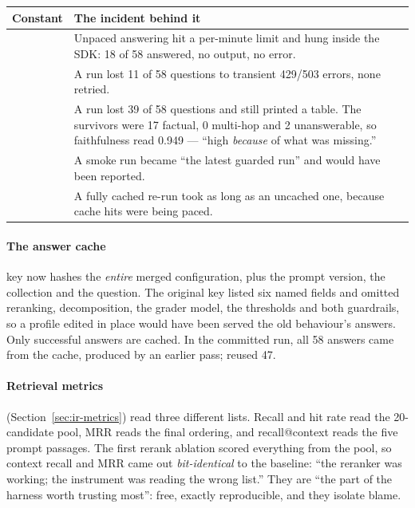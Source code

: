 \begin{center}\small
\begin{tabularx}{\textwidth}{@{}>{\raggedright\arraybackslash}p{3.9cm}L@{}}
\toprule
\textbf{Constant} & \textbf{The incident behind it}\\
\midrule
{} & Unpaced answering hit a per-minute limit and hung inside the SDK: 18 of 58 answered, no output, no error.\\
 & A  run lost 11 of 58 questions to transient 429/503 errors, none retried.\\
 & A run lost 39 of 58 questions and still printed a table. The survivors were 17 factual, 0 multi-hop and 2 unanswerable, so faithfulness read 0.949 --- ``high \emph{because} of what was missing.''\\
 & A  smoke run became ``the latest guarded run'' and would have been reported.\\
 & A fully cached re-run took as long as an uncached one, because cache hits were being paced.\\
\bottomrule
\end{tabularx}
\end{center}

\paragraph{The answer cache} key now hashes the \emph{entire} merged configuration, plus the prompt version, the collection and the question. The original key listed six named fields and omitted reranking, decomposition, the grader model, the thresholds and both guardrails, so a profile edited in place would have been served the old behaviour's answers. Only successful answers are cached. \tagM{} In the committed  run, all 58 answers came from the cache, produced by an earlier  pass;  reused 47.

\paragraph{Retrieval metrics} (Section~\ref{sec:ir-metrics}) read three different lists. Recall and hit rate read the 20-candidate pool, MRR reads the final ordering, and recall@context reads the five prompt passages. The first rerank ablation scored everything from the pool, so context recall and MRR came out \emph{bit-identical} to the baseline: ``the reranker was working; the instrument was reading the wrong list.'' They are ``the part of the harness worth trusting most'': free, exactly reproducible, and they isolate blame.

